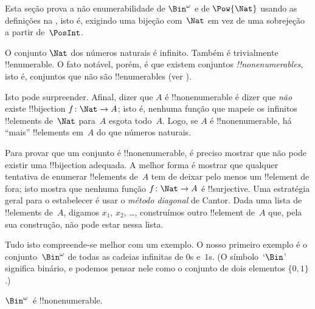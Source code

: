 \documentclass[../../../include/open-logic-section]{subfiles}
\begin{document}


\begin{editorial}
  Esta seção prova a não enumerabilidade de $\Bin^\omega$ e de $\Pow{\Nat}$
  usando as definições na , isto é, exigindo uma bijeção
  com~$\Nat$ em vez de uma sobrejeção a partir de~$\PosInt$.
\end{editorial}

\begin{explain}
O conjunto $\Nat$ dos números naturais é infinito. Também é trivialmente
!!{enumerable}. O fato notável, porém, é que existem conjuntos
\emph{!!{nonenumerable}s}, isto é, conjuntos que não são !!{enumerable}s (ver
).

Isto pode surpreender. Afinal, dizer que $A$ é !!{nonenumerable} é dizer que
\emph{não} existe !!{bijection} $f \colon \Nat \to A$; isto é, nenhuma função que
mapeie os infinitos !!{element}s de~$\Nat$ para~$A$ esgota todo~$A$. Logo, se $A$
é !!{nonenumerable}, há ``mais'' !!{element}s em~$A$ do que números naturais.

Para provar que um conjunto é !!{nonenumerable}, é preciso mostrar que não pode
existir uma !!{bijection} adequada. A melhor forma é mostrar que qualquer tentativa
de enumerar !!{element}s de~$A$ tem de deixar pelo menos um !!{element} de fora;
isto mostra que nenhuma função $f\colon \Nat \to A$ é !!{surjective}. Uma
estratégia geral para o estabelecer é usar o \emph{método diagonal} de Cantor.
Dada uma lista de !!{element}s de~$A$, digamos $x_1$, $x_2$, \dots, construímos
outro !!{element} de~$A$ que, pela sua construção, não pode estar nessa lista.

Tudo isto compreende-se melhor com um exemplo. O nosso primeiro exemplo é o
conjunto~$\Bin^\omega$ de todas as cadeias infinitas de $0$s e~$1$s. (O
símbolo~`$\Bin$' significa binário, e podemos pensar nele como o conjunto de
dois elementos
$\{0,1\}$.)
\end{explain}

\begin{thm}
$\Bin^\omega$~é !!{nonenumerable}.
\end{thm}
\end{document}
